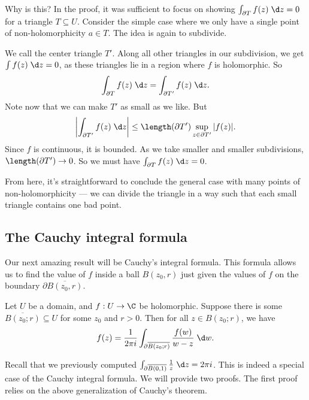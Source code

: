 \documentclass[a4paper]{article}
\begin{document}
Why is this? In the proof, it was sufficient to focus on showing $\int_{\partial T} f(z)\;\d z = 0$ for a triangle $T \subseteq U$. Consider the simple case where we only have a single point of non-holomorphicity $a \in T$. The idea is again to subdivide.
\begin{center}
\end{center}
We call the center triangle $T'$. Along all other triangles in our subdivision, we get $\int f(z)\;\d z = 0$, as these triangles lie in a region where $f$ is holomorphic. So
\[
  \int_{\partial T} f(z)\;\d z = \int_{\partial T'} f(z)\;\d z.
\]
Note now that we can make $T'$ as small as we like. But
\[
  \left|\int_{\partial T'} f(z)\;\d z\right| \leq \length(\partial T') \sup_{z \in \partial T'} |f(z)|.
\]
Since $f$ is continuous, it is bounded. As we take smaller and smaller subdivisions, $\length(\partial T') \to 0$. So we must have $\int_{\partial T} f(z)\;\d z = 0$.

From here, it's straightforward to conclude the general case with many points of non-holomorphicity --- we can divide the triangle in a way such that each small triangle contains one bad point.

\subsection{The Cauchy integral formula}
Our next amazing result will be Cauchy's integral formula. This formula allows us to find the value of $f$ inside a ball $B(z_0, r)$ just given the values of $f$ on the boundary $\partial \overline{B(z_0, r)}$.

\begin{thm}
  Let $U$ be a domain, and $f: U \to \C$ be holomorphic. Suppose there is some $\overline{B(z_0; r)} \subseteq U$ for some $z_0$ and $r > 0$. Then for all $z \in B(z_0; r)$, we have
  \[
    f(z) = \frac{1}{2\pi i} \int_{\partial \overline{B(z_0; r)}} \frac{f(w)}{w - z}\;\d w.
  \]
\end{thm}
Recall that we previously computed $\int_{\partial \overline{B(0, 1)}} \frac{1}{z} \;\d z= 2\pi i$. This is indeed a special case of the Cauchy integral formula. We will provide two proofs. The first proof relies on the above generalization of Cauchy's theorem.
\end{document}
